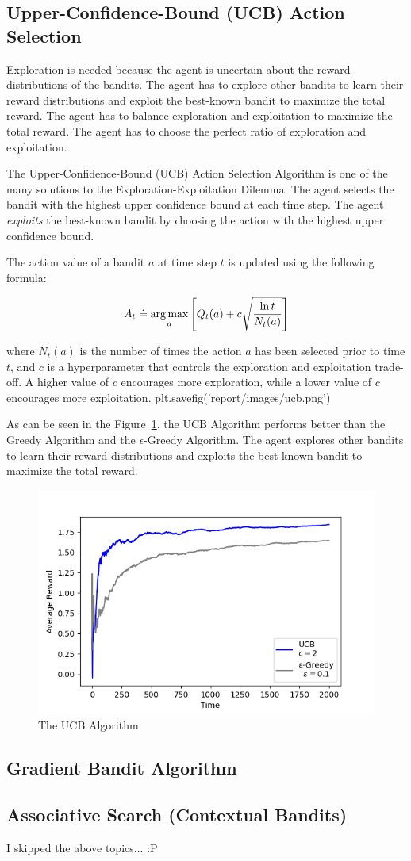 \subsection{Upper-Confidence-Bound (UCB) Action Selection}

Exploration is needed because the agent is uncertain about the reward distributions of the bandits. The agent has to explore other bandits to learn their reward distributions and exploit the best-known bandit to maximize the total reward. The agent has to balance exploration and exploitation to maximize the total reward. The agent has to choose the perfect ratio of exploration and exploitation.

The Upper-Confidence-Bound (UCB) Action Selection Algorithm is one of the many solutions to the Exploration-Exploitation Dilemma. The agent selects the bandit with the highest upper confidence bound at each time step. The agent \textit{exploits} the best-known bandit by choosing the action with the highest upper confidence bound.

The action value of a bandit $a$ at time step $t$ is updated using the following formula:

\begin{equation}
    A_t \doteq \operatorname*{arg\,max}_{a} \left[Q_t(a) + c\sqrt{\frac{\ln t}{N_t(a)}}\right]
\end{equation}

where $N_t(a)$ is the number of times the action $a$ has been selected prior to time $t$, and $c$ is a hyperparameter that controls the exploration and exploitation trade-off. A higher value of $c$ encourages more exploration, while a lower value of $c$ encourages more exploitation.
plt.savefig('report/images/ucb.png')

As can be seen in the Figure~\ref{fig:ucb}, the UCB Algorithm performs better than the Greedy Algorithm and the $\epsilon$-Greedy Algorithm. The agent explores other bandits to learn their reward distributions and exploits the best-known bandit to maximize the total reward.

\begin{figure}[h!]
    \centering
    \includegraphics[width=0.75\linewidth]{images/ucb.png}
    \caption{The UCB Algorithm}
    \label{fig:ucb}
\end{figure}

\subsection{Gradient Bandit Algorithm}

\subsection{Associative Search (Contextual Bandits)}

I skipped the above topics$\dots$ :P 
